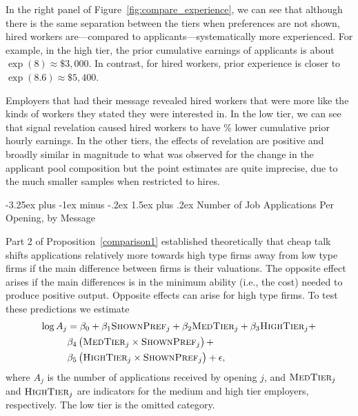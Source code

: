 \documentclass[12pt]{article}
\makeatletter
\renewcommand{\subsection}{%
  \@startsection{subsection}{2}{\z@}%
  {-3.25ex plus -1ex minus -.2ex}%
  {1.5ex plus .2ex}%
  {\normalfont\large\bfseries}%
}
\makeatother
\begin{document}
In the right panel of Figure~\ref{fig:compare_experience}, we can see that although there is the same separation between the tiers when preferences are not shown, hired workers are---compared to applicants---systematically more experienced.
For example, in the high tier, the prior cumulative earnings of applicants is about $\exp(8) \approx \$3,000$.
In contrast, for hired workers, prior experience is closer to $\exp(8.6) \approx \$5,400$.

Employers that had their message revealed hired workers that were more like the kinds of workers they stated they were interested in. 
In the low tier, we can see that signal revelation caused hired workers to have \EffectEarningsExperienceLowTierHiredRegression{}\% lower cumulative prior hourly earnings.
In the other tiers, the effects of revelation are positive and broadly similar in magnitude to what was observed for the change in the applicant pool composition but the point estimates are quite imprecise, due to the much smaller samples when restricted to hires. 

\subsection{Number of Job Applications Per Opening, by Message} %

Part 2 of Proposition~\ref{comparison1} established theoretically that cheap talk shifts applications relatively more towards high type firms away from low type firms if the main difference between firms is their valuations. The opposite effect arises if the main differences is in the minimum ability (i.e., the cost) needed to produce positive output. Opposite effects can arise for high type firms. To test these predictions we estimate
\begin{align} \label{eq:appsi}
  \log A_{j} & = \beta_0 + \beta_1 \textsc{ShownPref}_j + \beta_2 \textsc{MedTier}_j + \beta_3 \textsc{HighTier}_j  + \nonumber\\  
           & \beta_4 \left(\textsc{MedTier}_j \times \textsc{ShownPref}_j \right) + \nonumber \\  
           & \beta_5 \left(\textsc{HighTier}_j \times \textsc{ShownPref}_j\right) + \epsilon,
\end{align}
where $A_j$ is the number of applications received by opening $j$, and $\textsc{MedTier}_j$ and $\textsc{HighTier}_j$ are indicators for the medium and high tier employers, respectively.
The low tier is the omitted category.
\end{document}
